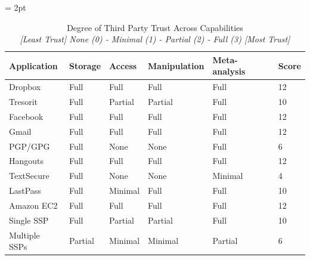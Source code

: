 \begin{table}[!hb]
  \footnotesize
  \centering
  \tabulinesep = 2pt
  \begin{tabu} to \textwidth
    { | X[1,c,m]
      | X[1,c,m]
      | X[1,c,m]
      | X[1,c,m]
      | X[1,c,m]
      | X[0.5,c,m]
      | }
    \hline
    \textbf{Application}
    & \textbf{Storage}
    & \textbf{Access}
    & \textbf{Manipulation}
    & \textbf{Meta-analysis}
    & \textbf{Score}
    \\ \hline
    \rowfont{\color{blue}}
    Dropbox
    & Full
    & Full
    & Full
    & Full
    & 12
    \\ \hline
    \rowfont{\color{orange}}
    Tresorit
    & Full
    & Partial
    & Partial
    & Full
    & 10
    \\ \hline
    \rowfont{\color{blue}}
    Facebook
    & Full
    & Full
    & Full
    & Full
    & 12
    \\ \hline
    \rowfont{\color{blue}}
    Gmail
    & Full
    & Full
    & Full
    & Full
    & 12
    \\ \hline
    \rowfont{\color{orange}}
    PGP/GPG
    & Full
    & None
    & None
    & Full
    & 6
    \\ \hline
    \rowfont{\color{blue}}
    Hangouts
    & Full
    & Full
    & Full
    & Full
    & 12
    \\ \hline
    \rowfont{\color{orange}}
    TextSecure
    & Full
    & None
    & None
    & Minimal
    & 4
    \\ \hline 
    \rowfont{\color{orange}}
    LastPass
    & Full
    & Minimal
    & Full
    & Full
    & 10
    \\ \hline 
    \rowfont{\color{blue}}
    Amazon EC2
    & Full
    & Full
    & Full
    & Full
    & 12
    \\ \hline 
    \rowfont{\color{ForestGreen}}
    Single SSP
    & Full
    & Partial
    & Partial
    & Full
    & 10
    \\ \hline 
    \rowfont{\color{ForestGreen}}
    Multiple SSPs
    & Partial
    & Minimal
    & Minimal
    & Partial
    & 6
    \\ \hline 
 \end{tabu}
  \caption[Degree of Third Party Trust Across Capabilities]{
    Degree of Third Party Trust Across Capabilities\\
    \textit{[Least Trust] None (0) - Minimal (1) - Partial (2) - Full (3) [Most Trust]}
  }
  \label{tab:trust:app:cap}
\end{table}

